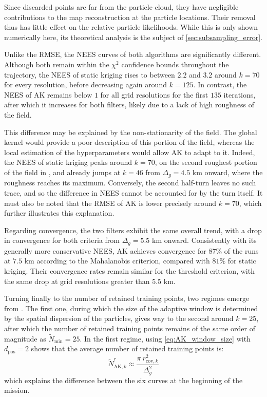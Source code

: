 Since discarded points are far from the particle cloud, they have negligible contributions to the map reconstruction at the particle locations. Their removal thus has little effect on the relative particle likelihoods. While this is only shown numerically here, its theoretical analysis is the subject of \cref{sec:subsampling_error}.

Unlike the RMSE, the NEES curves of both algorithms are significantly different. Although both remain within the $\chi^2$ confidence bounds throughout the trajectory, the NEES of static kriging rises to between $2.2$ and $3.2$ around $k=70$ for every resolution, before decreasing again around $k=125$. In contrast, the NEES of AK remains below $1$ for all grid resolutions for the first $135$ iterations, after which it increases for both filters, likely due to a lack of high roughness of the field. 

This difference may be explained by the non-stationarity of the field. The global kernel would provide a poor description of this portion of the field, whereas the local estimation of the hyperparameters would allow AK to adapt to it. Indeed, the NEES of static kriging peaks around $k=70$, on the second roughest portion of the field in , and already jumps at $k=46$ from $\Delta_g=4.5$ km onward, where the roughness reaches its maximum. Conversely, the second half-turn leaves no such trace, and so the difference in NEES cannot be accounted for by the turn itself. It must also be noted that the RMSE of AK is lower precisely around $k=70$, which further illustrates this explanation.

Regarding convergence, the two filters exhibit the same overall trend, with a drop in convergence for both criteria from $\Delta_g=5.5$ km onward. Consistently with its generally more conservative NEES, AK achieves convergence for $87\%$ of the runs at $7.5$ km according to the Mahalanobis criterion, compared with $81\%$ for static kriging. Their convergence rates remain similar for the threshold criterion, with the same drop at grid resolutions greater than $5.5$ km.

Turning finally to the number of retained training points, two regimes emerge from . The first one, during which the size of the adaptive window is determined by the spatial dispersion of the particles, gives way to the second around $k=25$, after which the number of retained training points remains of the same order of magnitude as $\tilde{N}_{\min}=25$. In the first regime, using \eqref{eq:AK_window_size} with $d_{\mathrm{pos}}=2$ shows that the average number of retained training points is:
\begin{equation}
	\tilde{N}_{\mathrm{AK},k}^r\approx\frac{\pi\:r_{\mathrm{cov},k}^2}{\Delta_g^2}
\end{equation}
which explains the difference between the six curves at the beginning of the mission.

